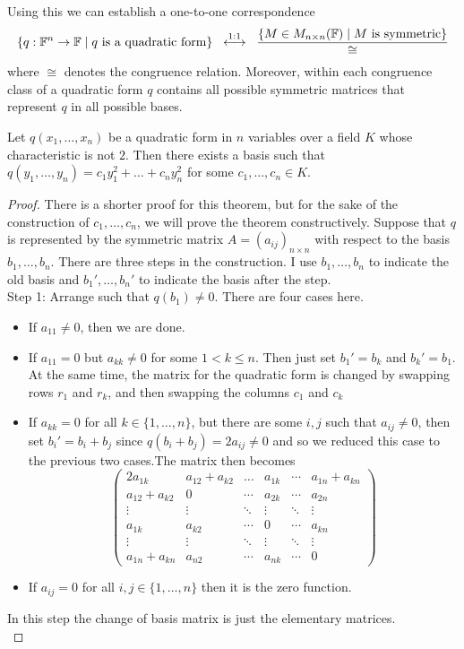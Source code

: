 \documentclass[a4paper]{article}
\begin{document}
Using this we can establish a one-to-one correspondence $$\left\{q:\mathbb{F}^n\to\mathbb{F}\;|\;q\text{ is a quadratic form}\right\}\;\;\overset{1:1}{\longleftrightarrow}\;\;\frac{\left\{M\in M_{n\times n}(\mathbb{F})\;|\;M\text{ is symmetric}\right\}}{\cong}$$ where $\cong$ denotes the congruence relation. Moreover, within each congruence class of a quadratic form $q$ contains all possible symmetric matrices that represent $q$ in all possible bases. 

\begin{thm}{}{} Let $q(x_1,\dots,x_n)$ be a quadratic form in $n$ variables over a field $K$ whose characteristic is not $2$. Then there exists a basis such that $q(y_1,\dots,y_n)=c_1y_1^2+\dots+c_ny_n^2$ for some $c_1,\dots,c_n\in K$. 
\begin{proof}
There is a shorter proof for this theorem, but for the sake of the construction of $c_1,\dots,c_n$, we will prove the theorem constructively. Suppose that $q$ is represented by the symmetric matrix $A=(a_{ij})_{n\times n}$ with respect to the basis $b_1,\dots,b_n$. There are three steps in the construction. I use $b_1,\dots,b_n$ to indicate the old basis and $b_1',\dots,b_n'$ to indicate the basis after the step. \\
Step 1: Arrange such that $q(b_1)\neq 0$. There are four cases here. 
\begin{itemize}
\item If $a_{11}\neq 0$, then we are done. 
\item If $a_{11}=0$ but $a_{kk}\neq 0$ for some $1<k\leq n$. Then just set $b_1'=b_k$ and $b_k'=b_1$. At the same time, the matrix for the quadratic form is changed by swapping rows $r_1$ and $r_k$, and then swapping the columns $c_1$ and $c_k$
\item If $a_{kk}=0$ for all $k\in\{1,\dots,n\}$, but there are some $i,j$ such that $a_{ij}\neq 0$, then set $b_i'=b_i+b_j$ since $q(b_i+b_j)=2a_{ij}\neq 0$ and so we reduced this case to the previous two cases.The matrix then becomes $$\begin{pmatrix}
2a_{1k} & a_{12}+a_{k2} & \dots & a_{1k} & \cdots & a_{1n}+a_{kn} \\
 a_{12}+a_{k2} & 0 & \cdots & a_{2k} & \cdots & a_{2n} \\
\vdots & \vdots & \ddots & \vdots & \ddots & \vdots \\
a_{1k} & a_{k2} & \cdots & 0 & \cdots & a_{kn}\\
\vdots & \vdots & \ddots & \vdots & \ddots & \vdots \\
a_{1n}+a_{kn} & a_{n2} & \cdots & a_{nk} & \cdots & 0
\end{pmatrix}$$
\item If $a_{ij}=0$ for all $i,j\in\{1,\dots,n\}$ then it is the zero function. 
\end{itemize}
In this step the change of basis matrix is just the elementary matrices. \\


\end{proof}
\end{thm}
\end{document}

